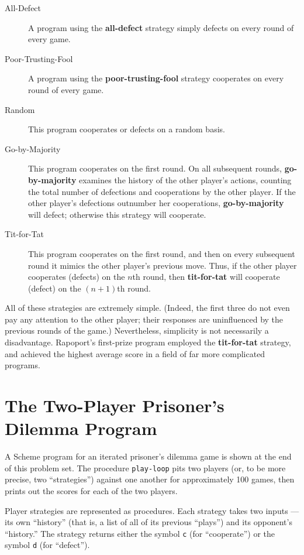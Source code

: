 \begin{description}

\item[All-Defect]
A program using the {\bf all-defect} strategy simply defects on
every round of every game.

\item[Poor-Trusting-Fool]
A program using the {\bf poor-trusting-fool} strategy cooperates
on every round of every game.

\item[Random]
This program cooperates or defects on a random basis.

\item[Go-by-Majority]
This program cooperates on the first round. On all subsequent rounds,
{\bf go-by-majority} examines the history of the other player's
actions, counting the total number of defections and cooperations by
the other player. If the other player's defections outnumber her
cooperations, {\bf go-by-majority} will defect; otherwise this
strategy will cooperate.

\item[Tit-for-Tat]
This program cooperates on the first round, and then on every subsequent
round it mimics the other player's previous move. Thus, if the other
player cooperates (defects) on the $n$th round, then {\bf tit-for-tat}
will cooperate (defect) on the $(n + 1)$th round.
\end{description}

All of these strategies are extremely simple. (Indeed, the first three
do not even pay any attention to the other player; their responses are
uninfluenced by the previous rounds of the game.)  Nevertheless,
simplicity is not necessarily a disadvantage.  Rapoport's first-prize
program employed the {\bf tit-for-tat} strategy, and achieved the
highest average score in a field of far more complicated programs.


\section{The Two-Player Prisoner's Dilemma Program}

A Scheme program for an iterated prisoner's dilemma game is shown at
the end of this problem set. The procedure {\tt play-loop} pits two
players (or, to be more precise, two ``strategies'') against one another
for approximately 100 games, then prints out the scores for each of
the two players.

Player strategies are represented as procedures. Each strategy takes
two inputs --- its own ``history'' (that is, a list of all of its
previous ``plays'') and its opponent's ``history.'' The strategy
returns either the symbol {\tt c} (for ``cooperate'') or the symbol
{\tt d} (for ``defect'').

